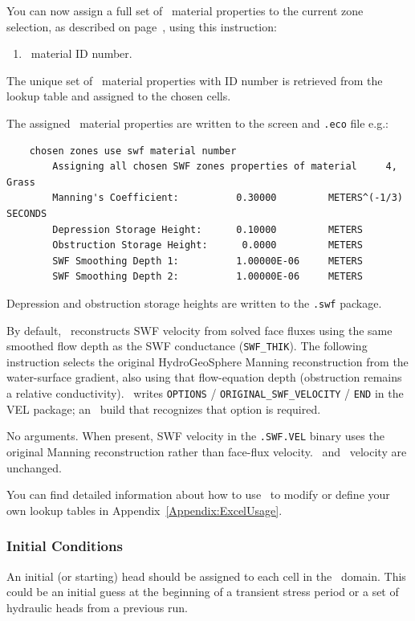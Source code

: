 You can now assign a full set of \swf\ material properties to the current zone selection, as described on page~\pageref{page:zoneSelect}, using this instruction:

    {
        \squish
        \begin{enumerate}
        \item {}  \swf\ material ID number.
        \end{enumerate}
        The unique set of \swf\ material properties with ID number  is retrieved from the lookup table and assigned to the chosen cells.    }

The assigned \swf\ material properties are written to the screen and \texttt{.eco} file e.g.:
\begin{verbatim}
    chosen zones use swf material number
    	Assigning all chosen SWF zones properties of material     4, Grass
    	Manning's Coefficient:          0.30000         METERS^(-1/3)  SECONDS
    	Depression Storage Height:      0.10000         METERS
    	Obstruction Storage Height:      0.0000         METERS
    	SWF Smoothing Depth 1:          1.00000E-06     METERS
    	SWF Smoothing Depth 2:          1.00000E-06     METERS
\end{verbatim}

Depression and obstruction storage heights are written to the \texttt{.swf} package.

By default, \mfus\ reconstructs SWF velocity from solved face fluxes using the same smoothed flow depth as the SWF conductance (\texttt{SWF\_THIK}). The following instruction selects the original HydroGeoSphere Manning reconstruction from the water-surface gradient, also using that flow-equation depth (obstruction remains a relative conductivity). \mut\ writes \texttt{OPTIONS} / \texttt{ORIGINAL\_SWF\_VELOCITY} / \texttt{END} in the VEL package; an \mfus\ build that recognizes that option is required.

    {
        No arguments.  When present, SWF velocity in the \texttt{.SWF.VEL} binary uses the original Manning reconstruction rather than face-flux velocity. \gwf\ and \cln\ velocity are unchanged.
    }

You can find detailed information about how to use \excel\ to modify or define your own lookup tables in Appendix~\ref{Appendix:ExcelUsage}.

\subsubsection{Initial Conditions}  
An initial (or starting) head should be assigned to each cell in the \swf\ domain.  This could be an initial guess at the beginning of a transient stress period or a set of hydraulic heads from a previous run.

